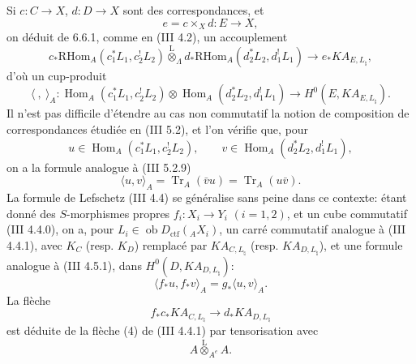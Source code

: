 \documentclass[11pt]{article}
\DeclareMathOperator{\Hom}{Hom}
\providecommand{\RHom}{\mathrm{RHom}}
\providecommand{\Tr}{\operatorname{Tr}}
\providecommand{\Tr}{\operatorname{Tr}}
\providecommand{\lten}{\overset{\mathrm L}{\otimes}}
\providecommand{\Ob}{\operatorname{ob}}
\providecommand{\Tr}{\operatorname{Tr}}
\providecommand{\RHom}{\mathrm{RHom}}
\providecommand{\Hom}{\operatorname{Hom}}
\providecommand{\lten}{\overset{\mathrm L}{\otimes}}
\providecommand{\RHom}{\mathrm R\mathcal{H}om}
\providecommand{\lten}{\overset{\mathrm L}{\otimes}}
\providecommand{\Ob}{\operatorname{ob}}
\providecommand{\Tr}{\operatorname{Tr}}
\providecommand{\lten}{\overset{\mathrm L}{\otimes}}
\providecommand{\lten}{\overset{\mathrm L}{\otimes}}
\providecommand{\Ob}{\operatorname{Ob}}
\providecommand{\lten}{\overset{\mathrm L}{\otimes}}
\providecommand{\RHom}{\mathrm{RHom}}
\providecommand{\Hom}{\operatorname{Hom}}
\providecommand{\Tr}{\operatorname{Tr}}
\providecommand{\Ob}{\operatorname{ob}}
\providecommand{\Ob}{\operatorname{Ob}}
\providecommand{\lten}{\overset{\mathrm L}{\otimes}}
\begin{document}
Si $c:C\to X$, $d:D\to X$ sont des correspondances, et
\[
e=c\times_Xd:E\to X,
\]
on déduit de 6.6.1, comme en (III 4.2), un accouplement
\begin{equation}
c_*\RHom_A(c_1^*L_1,c_2^!L_2)
\lten_{\Lambda}
d_*\RHom_A(d_2^*L_2,d_1^!L_1)
\longrightarrow
e_*KA_{E,L_{\natural}},
\tag{6.6.2}
\end{equation}
d'où un cup-produit
\begin{equation}
\langle\ ,\ \rangle_A:
\Hom_A(c_1^*L_1,c_2^!L_2)\otimes
\Hom_A(d_2^*L_2,d_1^!L_1)
\longrightarrow
H^0(E,KA_{E,L_{\natural}}).
\tag{6.6.3}
\end{equation}
Il n'est pas difficile d'étendre au cas non commutatif la notion de composition de correspondances étudiée en (III 5.2), et l'on vérifie que, pour
\[
u\in\Hom_A(c_1^*L_1,c_2^!L_2),\qquad
v\in\Hom_A(d_2^*L_2,d_1^!L_1),
\]
on a la formule analogue à (III 5.2.9)
\begin{equation}
\langle u,v\rangle_A=\Tr_A(\bar vu)=\Tr_A(u\bar v).
\tag{6.6.4}
\end{equation}
La formule de Lefschetz (III 4.4) se généralise sans peine dans ce contexte: étant donné des $S$-morphismes propres $f_i:X_i\to Y_i$ $(i=1,2)$, et un cube commutatif (III 4.4.0), on a, pour $L_i\in\Ob D_{\mathrm{ctf}}({}_AX_i)$, un carré commutatif analogue à (III 4.4.1), avec $K_C$ (resp. $K_D$) remplacé par $KA_{C,L_{\natural}}$ (resp. $KA_{D,L_{\natural}}$), et une formule analogue à (III 4.5.1), dans $H^0(D,KA_{D,L_{\natural}})$:
\begin{equation}
\langle f_*u,f_*v\rangle_A=g_*\langle u,v\rangle_A.
\tag{6.6.5}
\end{equation}
La flèche
\[
f_*c_*KA_{C,L_{\natural}}\longrightarrow d_*KA_{D,L_{\natural}}
\]
est déduite de la flèche (4) de (III 4.4.1) par tensorisation avec
\[
A\lten_{A^e}A .
\]
\end{document}
